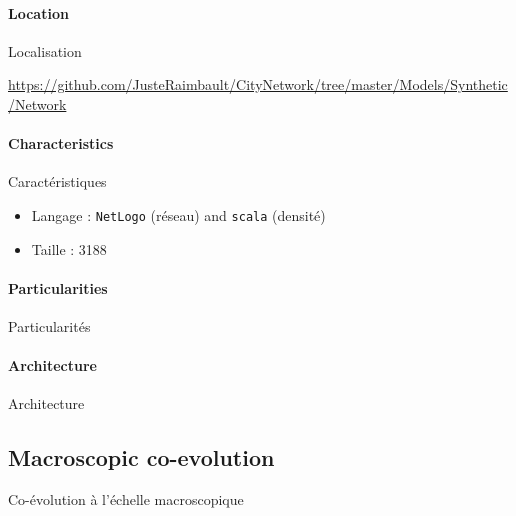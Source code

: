 \paragraph{Location}{Localisation}

\url{https://github.com/JusteRaimbault/CityNetwork/tree/master/Models/Synthetic/Network}

\paragraph{Characteristics}{Caractéristiques}

\begin{itemize}
\item Langage : \texttt{NetLogo} (réseau) and \texttt{scala} (densité)
\item Taille : 3188
\end{itemize}


\paragraph{Particularities}{Particularités}



\paragraph{Architecture}{Architecture}










\subsection{Macroscopic co-evolution}{Co-évolution à l'échelle macroscopique}

